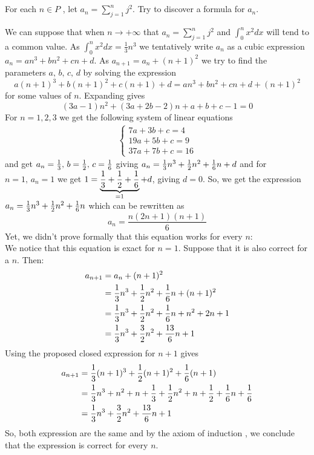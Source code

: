\subsection{}
\begin{tcolorbox}
For each $n \in P$ , let $a_n = \sum_{j=1}^{n}j^2$. Try to discover a formula for $a_n$.
\end{tcolorbox}
$$ $$
We can suppose that when $n\rightarrow +\infty$ that $a_n = \sum_{j=1}^{n}j^2$ and $\int_0^{n}x^2dx$ will tend to a common value. As $\int_0^{n}x^2dx= \frac{1}{3}n^3$ we tentatively write $a_n$ as a cubic expression $a_n= an^3+bn^2+cn+d$. As $a_{n+1} = a_n +(n+1)^2$ we try to find the parameters $a,\,b,\,c,\,d $ by solving the expression $$ a(n+1)^3+b(n+1)^2+c(n+1)+d =  an^3+bn^2+cn+d+ (n+1)^2$$
for some values of $n$.
Expanding gives $$(3a-1)n^2+(3a+2b-2)n+a+b+c-1=0 $$
For $n=1,2,3$ we get the following system of linear equations
\begin{align*}
\left\{
\begin{array}{l}
7a+3b+c=4\\
19a+5b+c=9\\
37a+7b+c=16
\end{array}
\right.
\end{align*}
and get $a_n=\frac{1}{3},\, b= \frac{1}{2},\, c= \frac{1}{6}$ giving
$a_n= \frac{1}{3}n^3+\frac{1}{2} n^2+\frac{1}{6}n+d$ and for $n=1,\, a_n=1$ we get $1= \underbrace{\frac{1}{3}+\frac{1}{2}+\frac{1}{6}}_{=1}+d$, giving $d=0$.
So, we get the expression $a_n= \frac{1}{3}n^3+\frac{1}{2} n^2+\frac{1}{6}n$ which can be rewritten as 
$$ a_n= \frac{n(2n+1)(n+1)}{6}$$ 
Yet, we didn't prove formally that this equation works for every $n$:\\
We notice that this equation is exact for $n=1$. Suppose that it is also correct for a $n$. Then:\\
\begin{align*}
a_{n+1}&= a_{n} + (n+1)^2\\
&=  \frac{1}{3}n^3+\frac{1}{2} n^2+\frac{1}{6}n + (n+1)^2\\
&=  \frac{1}{3}n^3+\frac{1}{2} n^2+\frac{1}{6}n + n^2+2n+1\\
&=  \frac{1}{3}n^3+\frac{3}{2}n^2+\frac{13}{6}n+1\\
\end{align*}
Using the proposed closed expression for $n+1$ gives
\begin{align*}
a_{n+1}&=\frac{1}{3}(n+1)^3+\frac{1}{2} (n+1)^2+\frac{1}{6}(n+1)\\
&=\frac{1}{3}n^3+n^2+n+\frac{1}{3}+\frac{1}{2} n^2+n+\frac{1}{2}+\frac{1}{6}n+\frac{1}{6}\\
&=\frac{1}{3}n^3+\frac{3}{2}n^2+\frac{13}{6}n+1\\
\end{align*}
So, both expression are the same and by the axiom of induction , we conclude that the expression is correct for every $n$.

